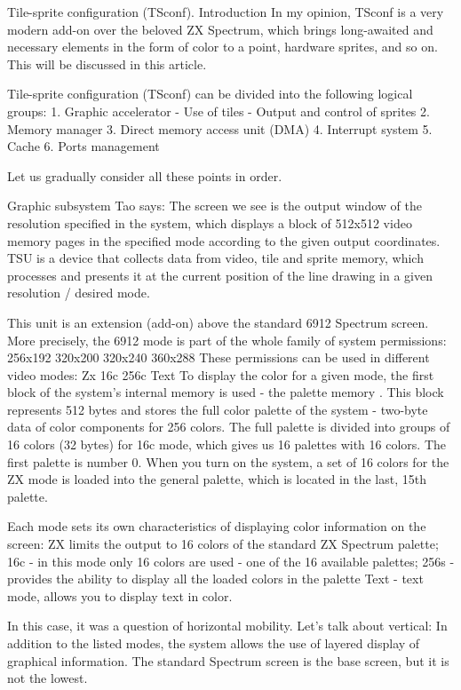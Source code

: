 Tile-sprite configuration (TSconf). Introduction
In my opinion, TSconf is a very modern add-on over the beloved ZX Spectrum, which brings long-awaited and necessary elements in the form of color to a point, hardware sprites, and so on. This will be discussed in this article. 

Tile-sprite configuration (TSconf) can be divided into the following logical groups: 
1. Graphic accelerator 
- Use of tiles 
- Output and control of sprites 
2. Memory manager 
3. Direct memory access unit (DMA) 
4. Interrupt system 
5. Cache 
6. Ports management 

Let us gradually consider all these points in order.

Graphic subsystem
Tao says: The screen we see is the output window of the resolution specified in the system, which displays a block of 512x512 video memory pages in the specified mode according to the given output coordinates. TSU is a device that collects data from video, tile and sprite memory, which processes and presents it at the current position of the line drawing in a given resolution / desired mode.

This unit is an extension (add-on) above the standard 6912 Spectrum screen. More precisely, the 6912 mode is part of the whole family of system permissions:
256x192
320x200
320x240
360x288
These permissions can be used in different video modes:
Zx
16c
256c
Text
To display the color for a given mode, the first block of the system's internal memory is used - the palette memory . This block represents 512 bytes and stores the full color palette of the system - two-byte data of color components for 256 colors. 
The full palette is divided into groups of 16 colors (32 bytes) for 16c mode, which gives us 16 palettes with 16 colors. 
The first palette is number 0. 
When you turn on the system, a set of 16 colors for the ZX mode is loaded into the general palette, which is located in the last, 15th palette. 

Each mode sets its own characteristics of displaying color information on the screen: 
ZX limits the output to 16 colors of the standard ZX Spectrum palette;
16c - in this mode only 16 colors are used - one of the 16 available palettes; 
256s - provides the ability to display all the loaded colors in the palette 
Text - text mode, allows you to display text in color. 

In this case, it was a question of horizontal mobility. Let's talk about vertical: 
In addition to the listed modes, the system allows the use of layered display of graphical information. The standard Spectrum screen is the base screen, but it is not the lowest. 

